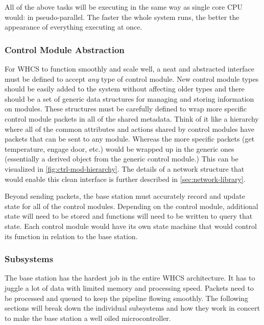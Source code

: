 All of the above tasks will be executing in the same way as single core CPU
would: in pseudo-parallel. The faster the whole system runs, the better the
appearance of everything executing at once.

\subsubsection{Control Module Abstraction}
For WHCS to function smoothly and scale well, a neat and abstracted interface
must be defined to accept \emph{any} type of control module. New control module
types should be easily added to the system without affecting older types and
there should be a set of generic data structures for managing and storing
information on modules. These structures must be carefully defined to wrap more
specific control module packets in all of the shared metadata. Think of it like
a hierarchy where all of the common attributes and actions shared by control
modules have packets that can be sent to any module. Whereas the more specific
packets (get temperature, engage door, etc.) would be wrapped up in the generic
ones (essentially a derived object from the generic control module.) This can
be visualized in \autoref{fig:ctrl-mod-hierarchy}. The
details of a network structure that would enable this clean interface is
further described in \autoref{sec:network-library}.


Beyond sending packets, the base station must accurately record and update
state for all of the control modules. Depending on the control module,
additional state will need to be stored and functions will need to be written
to query that state. Each control module would have its own state machine that
would control its function in relation to the base station.

%

\subsubsection{Subsystems}
The base station has the hardest job in the entire WHCS architecture. It has to
juggle a lot of data with limited memory and processing speed. Packets need to be
processed and queued to keep the pipeline flowing smoothly. The following
sections will break down the individual subsystems and how they work in concert
to make the base station a well oiled microcontroller.

